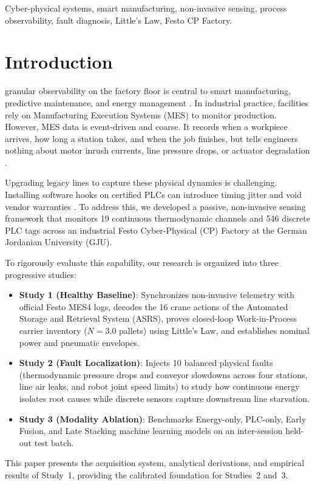 \documentclass[journal]{IEEEtran}
\begin{document}
\begin{IEEEkeywords}
Cyber-physical systems, smart manufacturing, non-invasive sensing, process observability, fault diagnosis, Little's Law, Festo CP Factory.
\end{IEEEkeywords}

\section{Introduction}
 granular observability on the factory floor is central to smart manufacturing, predictive maintenance, and energy management \cite{ref_tao_dt_survey, ref_kritzinger_dt_review, ref_qi_dt_service}. In industrial practice, facilities rely on Manufacturing Execution Systems (MES) to monitor production. However, MES data is event-driven and coarse. It records when a workpiece arrives, how long a station takes, and when the job finishes, but tells engineers nothing about motor inrush currents, line pressure drops, or actuator degradation \cite{ref_mes_standard, ref_saenz_mes_limits}.

Upgrading legacy lines to capture these physical dynamics is challenging. Installing software hooks on certified PLCs can introduce timing jitter and void vendor warranties \cite{ref_vogel_noninvasive}. To address this, we developed a passive, non-invasive sensing framework that monitors 19 continuous thermodynamic channels and 546 discrete PLC tags across an industrial Festo Cyber-Physical (CP) Factory at the German Jordanian University (GJU).

To rigorously evaluate this capability, our research is organized into three progressive studies:
\begin{itemize}
    \item \textbf{Study 1 (Healthy Baseline)}: Synchronizes non-invasive telemetry with official Festo MES4 logs, decodes the 16 crane actions of the Automated Storage and Retrieval System (ASRS), proves closed-loop Work-in-Process carrier inventory ($N = 3.0$ pallets) using Little's Law, and establishes nominal power and pneumatic envelopes.
    \item \textbf{Study 2 (Fault Localization)}: Injects 10 balanced physical faults (thermodynamic pressure drops and conveyor slowdowns across four stations, line air leaks, and robot joint speed limits) to study how continuous energy isolates root causes while discrete sensors capture downstream line starvation.
    \item \textbf{Study 3 (Modality Ablation)}: Benchmarks Energy-only, PLC-only, Early Fusion, and Late Stacking machine learning models on an inter-session held-out test batch.
\end{itemize}
This paper presents the acquisition system, analytical derivations, and empirical results of Study~1, providing the calibrated foundation for Studies~2 and~3.
\end{document}
